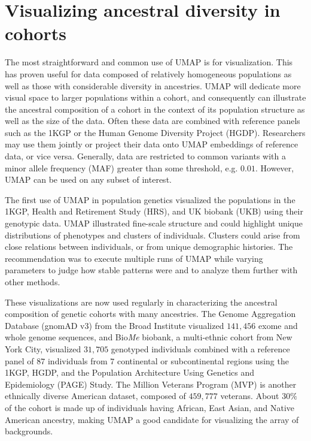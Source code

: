 \documentclass[12pt]{article}
\begin{document}
\section*{Visualizing ancestral diversity in cohorts}
The most straightforward and common use of UMAP is for visualization. This has proven useful for data composed of relatively homogeneous populations as well as those with considerable diversity in ancestries. UMAP will dedicate more visual space to larger populations within a cohort, and consequently can illustrate the ancestral composition of a cohort in the context of its population structure as well as the size of the data. Often these data are combined with reference panels such as the 1KGP or the Human Genome Diversity Project (HGDP)\cite{cann2002human}. Researchers may use them jointly or project their data onto UMAP embeddings of reference data, or vice versa. Generally, data are restricted to common variants with a minor allele frequency (MAF) greater than some threshold, e.g. $0.01$. However, UMAP can be used on any subset of interest.

The first use of UMAP in population genetics visualized the populations in the 1KGP, Health and Retirement Study (HRS)\cite{juster1995overview}, and UK biobank (UKB)\cite{sudlow2015uk} using their genotypic data. UMAP illustrated fine-scale structure and could highlight unique distributions of phenotypes and clusters of individuals. Clusters could arise from close relations between individuals, or from unique demographic histories. The recommendation was to execute multiple runs of UMAP while varying parameters to judge how stable patterns were and to analyze them further with other methods\cite{diaz-papkovich_umap_2019}.

These visualizations are now used regularly in characterizing the ancestral composition of genetic cohorts with many ancestries. The Genome Aggregation Database (gnomAD v3) from the Broad Institute visualized $141,456$ exome and whole genome sequences\cite{karczewski_mutational_2020}, and Bio\textit{Me} biobank, a multi-ethnic cohort from New York City, visualized $31,705$ genotyped individuals combined with a reference panel of $87$ individuals from $7$ continental or subcontinental regions using the 1KGP, HGDP, and the Population Architecture Using Genetics and Epidemiology (PAGE) Study\cite{matise2011next}. The Million Veterans Program (MVP) is another ethnically diverse American dataset, composed of $459,777$ veterans. About $30\%$ of the cohort is made up of individuals having African, East Asian, and Native American ancestry\cite{hunter-zinck_genotyping_2020}, making UMAP a good candidate for visualizing the array of backgrounds.
\end{document}
